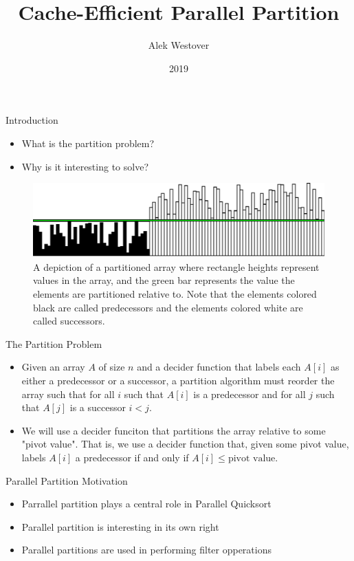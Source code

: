 \documentclass{beamer}
\title{Cache-Efficient Parallel Partition}
\author{Alek Westover}
\institute{MIT PRIMES}
\date{2019}
\begin{document}
 
\frame{\titlepage}

\begin{frame}[t]{Introduction}
	\begin{itemize}
		\item What is the partition problem?
		\item Why is it interesting to solve?
	\end{itemize}
	\begin{figure}
		\includegraphics[width=\linewidth]{partitionedArray.png}
		\caption{A depiction of a partitioned array where rectangle heights represent values in the array, and the green bar represents the value the elements are partitioned relative to. Note that the elements colored black are called predecessors and the elements colored white are called successors.}
		\label{fig:partitionedArray}
	\end{figure}
\end{frame}

\begin{frame}[t]{The Partition Problem}
	\begin{itemize}
		\item Given an array $A$ of size $n$ and a decider function that labels each $A[i]$ as either a predecessor or a successor, a partition algorithm must reorder the array such that for all $i$ such that $A[i]$ is a predecessor and for all $j$ such that $A[j]$ is a successor $i < j$.
		\item We will use a decider funciton that partitions the array relative to some "pivot value". That is, we use a decider function that, given some pivot value, labels $A[i]$ a predecessor if and only if $A[i] \le \text{pivot value}$.
\end{itemize}
\end{frame}

\begin{frame}[t]{Parallel Partition Motivation}
	\begin{itemize}
		\item Parrallel partition plays a central role in Parallel Quicksort
		\item Parallel partition is interesting in its own right
		\item Parallel partitions are used in performing filter opperations
\end{itemize}	
\end{frame}
\end{document}
